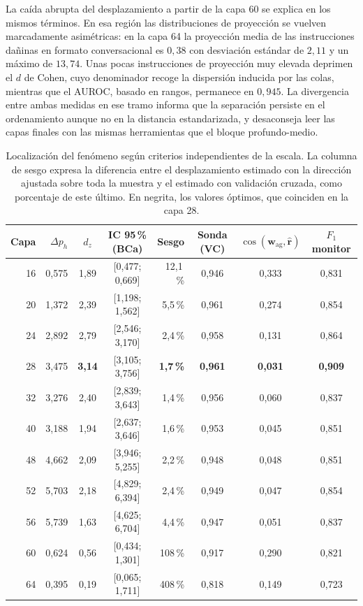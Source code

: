 \documentclass[12pt,a4paper]{article}
\begin{document}
La caída abrupta del desplazamiento a partir de la capa 60 se explica en los mismos términos. En esa región las distribuciones de proyección se vuelven marcadamente asimétricas: en la capa 64 la proyección media de las instrucciones dañinas en formato conversacional es $0{,}38$ con desviación estándar de $2{,}11$ y un máximo de $13{,}74$. Unas pocas instrucciones de proyección muy elevada deprimen el $d$ de Cohen, cuyo denominador recoge la dispersión inducida por las colas, mientras que el AUROC, basado en rangos, permanece en $0{,}945$. La divergencia entre ambas medidas en ese tramo informa que la separación persiste en el ordenamiento aunque no en la distancia estandarizada, y desaconseja leer las capas finales con las mismas herramientas que el bloque profundo-medio.

\begin{table}[htbp]
\centering
\small
\setlength{\tabcolsep}{5pt}
\begin{tabular}{@{}rrccrccc@{}}
\toprule
Capa & $\Delta p_{h}$ & $d_z$ & IC 95\,\% (BCa) & Sesgo & Sonda (VC) & $\cos(\bm{w}_{\text{ag}},\hat{\bm{r}})$ & $F_1$ monitor \\
\midrule
16 & 0,575 & 1,89 & [0,477; 0,669] & 12,1\,\% & 0,946 & 0,333 & 0,831 \\
20 & 1,372 & 2,39 & [1,198; 1,562] & 5,5\,\% & 0,961 & 0,274 & 0,854 \\
24 & 2,892 & 2,79 & [2,546; 3,170] & 2,4\,\% & 0,958 & 0,131 & 0,864 \\
28 & 3,475 & \textbf{3,14} & [3,105; 3,756] & \textbf{1,7\,\%} & \textbf{0,961} & \textbf{0,031} & \textbf{0,909} \\
32 & 3,276 & 2,40 & [2,839; 3,643] & 1,4\,\% & 0,956 & 0,060 & 0,837 \\
40 & 3,188 & 1,94 & [2,637; 3,646] & 1,6\,\% & 0,953 & 0,045 & 0,851 \\
48 & 4,662 & 2,09 & [3,946; 5,255] & 2,2\,\% & 0,948 & 0,048 & 0,851 \\
52 & 5,703 & 2,18 & [4,829; 6,394] & 2,4\,\% & 0,949 & 0,047 & 0,854 \\
56 & 5,739 & 1,63 & [4,625; 6,704] & 4,4\,\% & 0,947 & 0,051 & 0,837 \\
60 & 0,624 & 0,56 & [0,434; 1,301] & 108\,\% & 0,917 & 0,290 & 0,821 \\
64 & 0,395 & 0,19 & [0,065; 1,711] & 408\,\% & 0,818 & 0,149 & 0,723 \\
\bottomrule
\end{tabular}
\caption{Localización del fenómeno según criterios independientes de la escala. La columna de sesgo expresa la diferencia entre el desplazamiento estimado con la dirección ajustada sobre toda la muestra y el estimado con validación cruzada, como porcentaje de este último. En negrita, los valores óptimos, que coinciden en la capa 28.}
\label{tab:localizacion}
\end{table}
\end{document}
